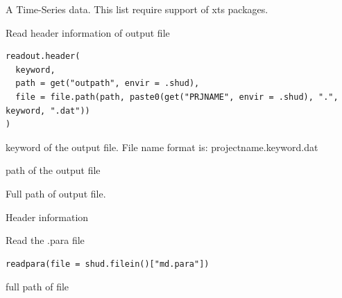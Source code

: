\documentclass[a4paper]{book}
\begin{document}
%
\begin{Value}
A Time-Series data. This list require support of xts packages.
\end{Value}
%
\begin{Description}\relax
Read header information of output file
\end{Description}
%
\begin{Usage}
\begin{verbatim}
readout.header(
  keyword,
  path = get("outpath", envir = .shud),
  file = file.path(path, paste0(get("PRJNAME", envir = .shud), ".", keyword, ".dat"))
)
\end{verbatim}
\end{Usage}
%
\begin{Arguments}
\begin{ldescription}
\item[\code{keyword}] keyword of the output file. File name format is: projectname.keyword.dat

\item[\code{path}] path of the output file

\item[\code{file}] Full path of output file.
\end{ldescription}
\end{Arguments}
%
\begin{Value}
Header information
\end{Value}
%
\begin{Description}\relax
Read the .para file
\end{Description}
%
\begin{Usage}
\begin{verbatim}
readpara(file = shud.filein()["md.para"])
\end{verbatim}
\end{Usage}
%
\begin{Arguments}
\begin{ldescription}
\item[\code{file}] full path of file
\end{ldescription}
\end{Arguments}
\end{document}
